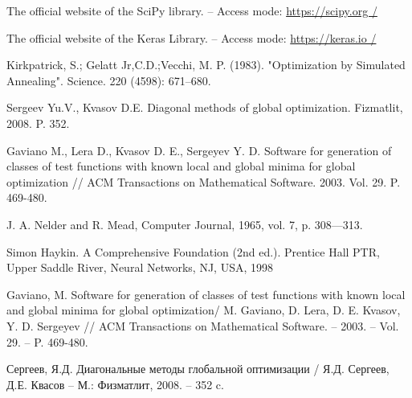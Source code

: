 \documentclass[11pt, oneside, a4paper]{article}
\begin{document}
\begin{biblioen}
The official website of the SciPy library. – Access mode: \url{https://scipy.org /}

The official website of the Keras Library. – Access mode: \url{https://keras.io /}

Kirkpatrick, S.; Gelatt Jr,C.D.;Vecchi, M. P. (1983). "Optimization by Simulated Annealing". Science. 220 (4598): 671–680.

Sergeev Yu.V., Kvasov D.E. Diagonal methods of global optimization. Fizmatlit, 2008. P. 352.

Gaviano M., Lera D., Kvasov D. E., Sergeyev Y. D. Software for generation of classes of test functions with known local and global minima for global optimization // ACM Transactions on Mathematical Software. 2003. Vol. 29. P. 469-480.

J. A. Nelder and R. Mead, Computer Journal, 1965, vol. 7, p. 308—313.

Simon Haykin. A Comprehensive Foundation (2nd ed.). Prentice Hall PTR, Upper
Saddle River, Neural Networks, NJ, USA, 1998 

Gaviano, M. Software for generation of classes of test functions with known local and global minima for global optimization/ M. Gaviano, D. Lera, D. E. Kvasov, Y. D. Sergeyev // ACM Transactions on Mathematical Software. – 2003. – Vol.  29. – P. 469-480.

Сергеев, Я.Д. Диагональные методы глобальной оптимизации / Я.Д. Сергеев, Д.Е. Квасов – М.: Физматлит, 2008. – 352 c.

\end{biblioen}
\end{document}
